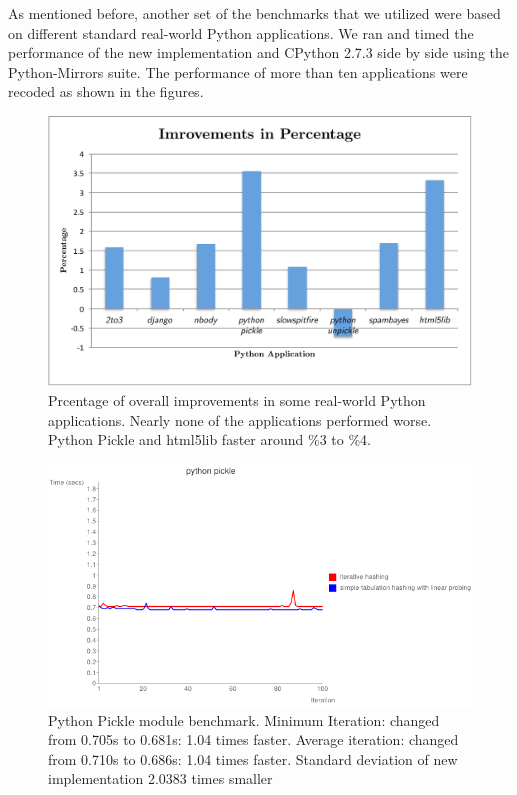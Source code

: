 \documentclass[12pt]{article}
\begin{document}
As mentioned before, another set of the benchmarks that we utilized were based on different standard real-world Python applications. We ran and timed the performance of the new implementation and CPython 2.7.3 side by side using the Python-Mirrors suite. The performance of more than ten applications were recoded as shown in the figures.

\begin{figure}[H]
  \centering
  \includegraphics[width=12cm]{appsbench.pdf}
  \caption{Prcentage of overall improvements in some real-world Python applications. Nearly none of the applications performed worse. Python Pickle and html5lib faster around \%3 to \%4. }
\end{figure}

\begin{figure}[H]
  \centering
  \includegraphics[width=12cm]{slowpickle.png}
  \caption{Python Pickle module benchmark. Minimum Iteration: changed from 0.705s to 0.681s: 1.04 times faster. Average iteration: changed from 0.710s to 0.686s: 1.04 times faster. Standard deviation of new implementation 2.0383 times smaller}
\end{figure}
\end{document}
